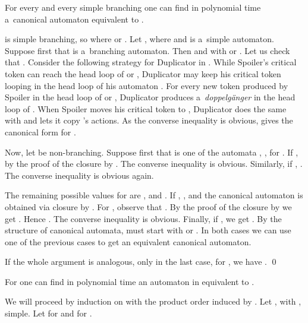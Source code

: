 \documentclass{LMCS}
\begin{document}
\begin{lem} \label{auxiliary_oplus} 
For every  and every simple branching   one can find in polynomial time a~canonical automaton equivalent to .
\end{lem}

\proof  is simple branching, so  where  or .  Let , where  and   is a~simple automaton. Suppose first that  is a~branching automaton. Then  and  with  or . Let us check that . Consider the following strategy for Duplicator in . While Spoiler's critical token  can reach the head loop of  or  , Duplicator may keep his critical token  looping in the head loop of his automaton . For every new token produced by Spoiler in the head loop of  or , Duplicator produces a~{\em doppelg\"anger} in  the head loop of . When Spoiler moves his critical token  to , Duplicator does the same with  and lets it copy 's actions. As the converse inequality is obvious,  gives the canonical form for .

Now, let  be non-branching. Suppose first that  is one of the automata , ,  for . If ,  by the proof of the closure by . The converse inequality is obvious. Similarly, if , . The converse inequality is obvious again.

The remaining possible values for  are ,  and . If , , and the canonical automaton is obtained via closure by . For , observe that  . By the proof of the closure by  we get . Hence . The converse inequality is obvious. Finally, if , we get . By the structure of canonical automata,  must start with  or . In both cases we can use one of the previous cases to get an equivalent canonical automaton.

If  the whole argument is analogous, only in the last case, for ,  we have . \qed

\begin{prop}\label{land_closure}
For  one can find in polynomial time an automaton in  equivalent to .
\end{prop}

\proof We will proceed by induction on  with the product order induced by . Let ,  with ,  simple. Let  for  and  for .
\end{document}
